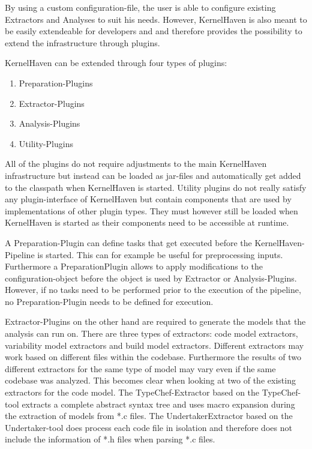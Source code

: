 \documentclass[a4paper]{article}
\begin{document}
By using a custom configuration-file, the user is able to configure existing Extractors and Analyses to suit his needs. However, KernelHaven is also meant to be easily extendeable for developers and and therefore provides the possibility to extend the infrastructure through plugins.

KernelHaven can be extended through four types of plugins:

\begin{enumerate}
    \item Preparation-Plugins
	\item Extractor-Plugins
	\item Analysis-Plugins
	\item Utility-Plugins
\end{enumerate}

All of the plugins do not require adjustments to the main KernelHaven infrastructure but instead can be loaded as jar-files and automatically get added to the classpath when KernelHaven is started. Utility plugins do not really satisfy any plugin-interface of KernelHaven but contain components that are used by implementations of other plugin types. They must however still be loaded when KernelHaven is started as their components need to be accessible at runtime.

A Preparation-Plugin can define tasks that get executed before the KernelHaven-Pipeline is started. This can for example be useful for preprocessing inputs. Furthermore a PreparationPlugin allows to apply modifications to the configuration-object before the object is used by Extractor or Analysis-Plugins. However, if no tasks need to be performed prior to the execution of the pipeline, no Preparation-Plugin needs to be defined for execution. 

Extractor-Plugins on the other hand are required to generate the models that the analysis can run on. There are three types of extractors: code model extractors, variability model extractors and build model extractors. Different extractors may work based on different files within the codebase. Furthermore the results of two different extractors for the same type of model may vary even if the same codebase was analyzed. This becomes clear when looking at two of the existing extractors for the code model. The TypeChef-Extractor based on the TypeChef-tool \cite{Kenner:2010:TTT:1868688.1868693} extracts a complete abstract syntax tree and uses macro expansion during the extraction of models from *.c files. The UndertakerExtractor based on the Undertaker-tool \cite{Tartler:2011:FCC:1966445.1966451} does process each code file in isolation and therefore does not include the information of *.h files when parsing *.c files.
\end{document}
